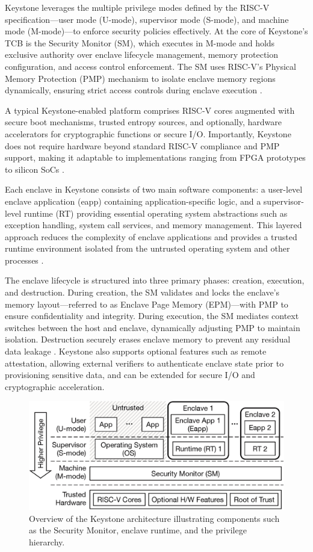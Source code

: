 Keystone leverages the multiple privilege modes defined by the RISC-V specification—user mode (U-mode), supervisor mode (S-mode), and machine mode (M-mode)—to enforce security policies effectively. At the core of Keystone’s TCB is the Security Monitor (SM), which executes in M-mode and holds exclusive authority over enclave lifecycle management, memory protection configuration, and access control enforcement. The SM uses RISC-V’s Physical Memory Protection (PMP) mechanism to isolate enclave memory regions dynamically, ensuring strict access controls during enclave execution \cite{dayeol2019keystone}.

A typical Keystone-enabled platform comprises RISC-V cores augmented with secure boot mechanisms, trusted entropy sources, and optionally, hardware accelerators for cryptographic functions or secure I/O. Importantly, Keystone does not require hardware beyond standard RISC-V compliance and PMP support, making it adaptable to implementations ranging from FPGA prototypes to silicon SoCs \cite{dayeol2019keystone}.

Each enclave in Keystone consists of two main software components: a user-level enclave application (eapp) containing application-specific logic, and a supervisor-level runtime (RT) providing essential operating system abstractions such as exception handling, system call services, and memory management. This layered approach reduces the complexity of enclave applications and provides a trusted runtime environment isolated from the untrusted operating system and other processes \cite{dayeol2019keystone}.

The enclave lifecycle is structured into three primary phases: creation, execution, and destruction. During creation, the SM validates and locks the enclave’s memory layout—referred to as Enclave Page Memory (EPM)—with PMP to ensure confidentiality and integrity. During execution, the SM mediates context switches between the host and enclave, dynamically adjusting PMP to maintain isolation. Destruction securely erases enclave memory to prevent any residual data leakage \cite{dayeol2019keystone}. Keystone also supports optional features such as remote attestation, allowing external verifiers to authenticate enclave state prior to provisioning sensitive data, and can be extended for secure I/O and cryptographic acceleration.

\begin{figure}[htbp]
\centering
\includegraphics[width=0.9\linewidth]{figures/keystone_overview.png}
\caption{Overview of the Keystone architecture illustrating components such as the Security Monitor, enclave runtime, and the privilege hierarchy.}
\label{fig:keystone_overview}
\end{figure}

